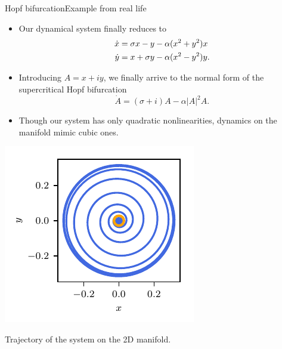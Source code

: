 \documentclass[usenames,dvipsnames,svgnames,10pt,aspectratio=169]{beamer}
\begin{document}
\begin{frame}[t, c]{Hopf bifurcation}{Example from real life}
	\begin{minipage}{.6\textwidth}
		\begin{itemize}
			\item Our dynamical system finally reduces to
			\begin{equation}
				\begin{aligned}
					\dot{x} & = \sigma x - y - \alpha (x^2 + y^2)x \\
					\dot{y} & = x + \sigma y - \alpha (x^2 - y^2)y.
				\end{aligned}
				\notag
			\end{equation}

			\medskip

			\item Introducing $A = x + iy$, we finally arrive to the normal form of the supercritical Hopf bifurcation
			$$\dot{A} = (\sigma + i)A - \alpha \vert A \vert^2 A.$$

			\medskip

			\item Though our system has only quadratic nonlinearities, dynamics on the manifold mimic cubic ones.
		\end{itemize}
	\end{minipage}%
	\hfill
	\begin{minipage}{.28\textwidth}
		\centering
		\includegraphics[width=.95\textwidth]{generalized_mean_field_model_2D}

		{\small Trajectory of the system on the 2D manifold.}
	\end{minipage}

	\vspace{1cm}
\end{frame}
\end{document}

